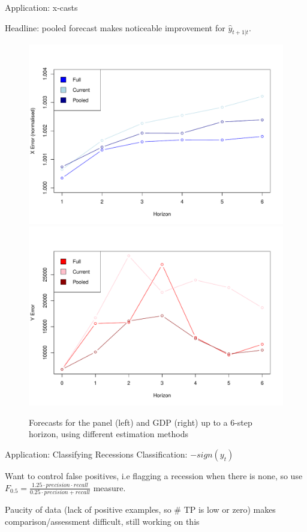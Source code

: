 \documentclass[11pt]{beamer}
\begin{document}
\begin{frame}{Application: x-casts}

Headline: pooled forecast makes noticeable improvement for $\hat{y}_{t+1|t}$.

\begin{figure}[!h]
	\centering
	\includegraphics[scale=0.25]{app/appXforecast2.pdf}
	\includegraphics[scale=0.25]{app/appYforecast2.pdf}
	\caption{Forecasts for the panel (left) and GDP (right) up to a 6-step horizon, using different estimation methods}
	\label{fig:appforecasts}
\end{figure}
 \end{frame}
 
 
\begin{frame}{Application: Classifying Recessions}
Classification: $-sign(y_t)$

 Want to control false positives, i.e flagging a recession when there is none, so use $F_{0.5} = \frac{1.25 \cdot precision \cdot recall}{0.25 \cdot precision + recall}$ measure.
 
Paucity of data (lack of positive examples, so \# TP is low or zero) makes comparison/assessment difficult,  still working on this
\end{frame}
\end{document}
